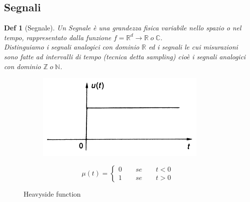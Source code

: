 \documentclass[a4paper]{article}
\newtheorem*{definition}{Def}
\newcommand{\R}[0]{\mathbb{R}}
\newcommand{\C}[0]{\mathbb{C}}
\begin{document}
\subsection{Segnali}
\begin{definition}[Segnale]
	Un Segnale è una grandezza fisica variabile nello spazio o nel tempo, rappresentato dalla funzione $f = \R^d \rightarrow \R \; o \; \C$.\\
	Distinguiamo i segnali \textit{analogici} con dominio $\R$ ed i segnali le cui misurazioni sono fatte ad intervalli di tempo (tecnica detta \textit{sampling}) cioè i segnali \textit{analogici} con dominio $\mathbb{Z} \; o \; \mathbb{N}$.
\end{definition}
\begin{figure}[H]
	\begin{subfigure}[c]{0.5\textwidth}
	\includegraphics[width=\textwidth]{heavyside_func.png}
	\end{subfigure}
	\begin{subfigure}[c]{0.5\textwidth}
		\begin{equation*}
			\mu(t) = 
			\begin{cases}
				0 \qquad se \qquad t<0 \\
				1 \qquad se \qquad t>0 
			\end{cases}
		\end{equation*}
	\end{subfigure}
	\caption{Heavyside function} \label{FIG:heavyside}
\end{figure}
\end{document}
